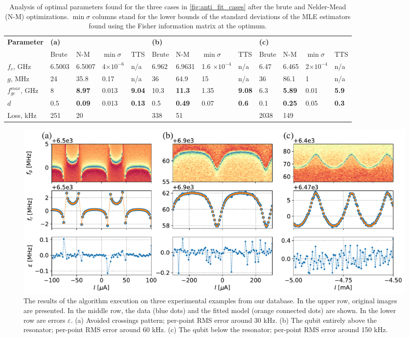 \documentclass[%
 aip,
 amsmath,amssymb,
 reprint,%
]{revtex4-1}
\begin{document}
\begin{table}
	\centering
	\begin{ruledtabular}
		\renewcommand{\arraystretch}{1.2}

		\begin{tabular}{*{13}{l}} 
			\multirow{2}{*}{\textbf{Parameter}} & 
			\multicolumn{4}{l}{\textbf{(a)}} & 
			\multicolumn{4}{l}{\textbf{(b)}} & \multicolumn{4}{l}{\textbf{(c)}}\\
			& Brute & N-M & $\min \sigma$ & TTS  & Brute & N-M & $\min \sigma$ & TTS  & Brute& N-M & $\min \sigma$ & TTS  \\
			\hline
			$f_c$, GHz &6.5003 & 6.5007 &  4$\times 10^{-6}$ & n/a & 6.962 & 6.9631 & 1.6 $\times 10^{-4}$  & n/a &  6.47 & 6.465& 2$\times 10^{-4}$ & n/a\\ 
			$g$, MHz & 24 & 35.8 & 0.17 & n/a & 36 & 64.9 & 15 & n/a & 36 & 86.1& 1 &n/a\\
			$f_{ge}^{max}$, GHz & 8 &\textbf{8.97} & 0.013 & \textbf{9.04} &10.3& \textbf{11.3}& 1.35 & \textbf{9.08}& 6.3& \textbf{5.89}&0.01&\textbf{5.9}\\
			$d$ &0.5& \textbf{0.09}& 0.013& \textbf{0.13} &0.5&\textbf{0.49} &0.07&\textbf{0.6}&0.1& \textbf{0.25} & 0.05 &\textbf{0.3} \\\hline
			Loss, kHz & 251 & 20 && &338& 51 & & &2038& 149&&
		\end{tabular} 
	\end{ruledtabular}
	\caption{Analysis of optimal parameters found for the three cases in \autoref{fig:anti_fit_cases} after the brute and Nelder-Mead (N-M) optimizations. $\min \sigma$ columns stand for the lower bounds of the standard deviations of the MLE estimators found using the Fisher information matrix at the optimum.}
	\label{tab:sts_results}
\end{table}

\begin{figure}
	\centering
	\includegraphics[width=\linewidth]{fit_cases}
	\caption{The results of the algorithm execution on three experimental examples from our database. In the upper row, original images are presented. In the middle row, the data  (blue dots) and the fitted model (orange connected dots) are shown. In the lower row are errors $\varepsilon$. (a) Avoided crossings pattern; per-point RMS error around 30 kHz. (b) The qubit entirely above the resonator; per-point RMS error around 60 kHz. (c) The qubit below the resonator; per-point RMS error around 150 kHz.}
	\label{fig:anti_fit_cases}
\end{figure}
\end{document}
